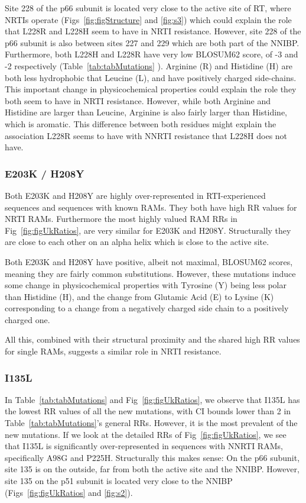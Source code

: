 \documentclass[
  11pt,
  twoside,
  BCOR=10mm,
  listof=totoc]{scrbook}
\begin{document}
Site 228 of the p66 subunit is located very close to the active site of
RT, where NRTIs operate (Figs~\ref{fig:figStructure} and \ref{fig:s3}) which could explain the role that L228R
and L228H seem to have in NRTI resistance. However, site 228 of the p66
subunit is also between sites 227 and 229 which are both part of the
NNIBP. Furthermore, both L228H and L228R have very low BLOSUM62 score,
of -3 and -2 respectively (Table~\ref{tab:tabMutations}
). Arginine (R) and Histidine (H) are both less
hydrophobic that Leucine (L), and have positively charged side-chains.
This important change in physicochemical properties could explain the
role they both seem to have in NRTI resistance. However, while both
Arginine and Histidine are larger than Leucine, Arginine is also fairly
larger than Histidine, which is aromatic. This difference between both
residues might explain the association L228R seems to have with NNRTI
resistance that L228H does not have.

\hypertarget{e203k-h208y}{%
\subsubsection{E203K / H208Y}\label{e203k-h208y}}

Both E203K and H208Y are highly over-represented in RTI-experienced
sequences and sequences with known RAMs. They both have high RR values
for NRTI RAMs. Furthermore the most highly valued RAM RRs in
Fig~\ref{fig:figUkRatios}, are
very similar for E203K and H208Y. Structurally they are close to each
other on an alpha helix which is close to the active site.

Both E203K and H208Y have positive, albeit not maximal, BLOSUM62 scores,
meaning they are fairly common substitutions. However, these mutations
induce some change in physicochemical properties with Tyrosine (Y) being
less polar than Histidine (H), and the change from Glutamic Acid (E) to
Lysine (K) corresponding to a change from a negatively charged side
chain to a positively charged one.

All this, combined with their structural proximity and the shared high
RR values for single RAMs, suggests a similar role in NRTI resistance.

\hypertarget{i135l}{%
\subsubsection{I135L}\label{i135l}}

In Table~\ref{tab:tabMutations} and Fig~\ref{fig:figUkRatios},
we observe that I135L has the lowest RR values
of all the new mutations, with CI bounds lower than 2 in
Table~\ref{tab:tabMutations}'s general RRs. However, it is the most
prevalent of the new mutations. If we look at the detailed RRs of
Fig~\ref{fig:figUkRatios}, we
see that I135L is significantly over-represented in sequences with NNRTI
RAMs, specifically A98G and P225H. Structurally this makes sense: On the
p66 subunit, site 135 is on the outside, far from both the active site
and the NNIBP. However, site 135 on the p51 subunit is located very
close to the NNIBP (Figs~\ref{fig:figUkRatios} and \ref{fig:s2}).
\end{document}
